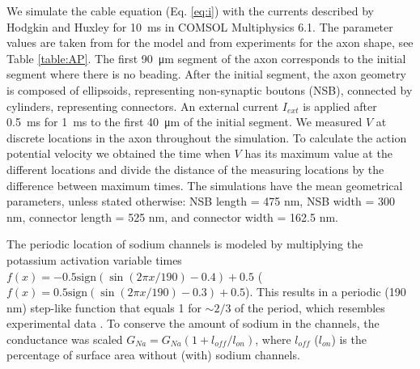 \documentclass[11pt]{article}
\begin{document}
We simulate the cable equation (Eq. \eqref{eq:i}) with the currents described by Hodgkin and Huxley for \SI{10}{\milli\second} in COMSOL Multiphysics 6.1. The parameter values are taken from \cite{koch2004biophysics} for the model and from experiments for the axon shape, see Table \ref{table:AP}. The first \SI{90}{\micro\meter} segment of the axon corresponds to the initial segment where there is no beading. After the initial segment, the axon geometry is composed of ellipsoids, representing non-synaptic boutons (NSB), connected by cylinders, representing connectors. An external current $I_{ext}$ is applied after \SI{0.5}{\milli\second} for \SI{1}{\milli\second} to the first \SI{40}{\micro\meter} of the initial segment. We measured $V$ at discrete locations in the axon throughout the simulation. To calculate the action potential velocity we obtained the time when $V$ has its maximum value at the different locations and divide the distance of the measuring locations by the difference between maximum times. 
The simulations have the mean geometrical parameters, unless stated otherwise: NSB length = 475 nm, NSB width = 300 nm, connector length = 525 nm, and connector width = 162.5 nm. 

The periodic location of sodium channels is modeled by multiplying the potassium activation variable times $f(x) = -0.5 \mathrm{sign} ( \sin (2\pi x/190)-0.4)+0.5 $ ($f(x) = 0.5 \mathrm{sign} ( \sin (2\pi x/190)-0.3)+0.5 $). This results in a periodic (190 nm) step-like function that equals 1 for $\sim 2/3$ of the period, which resembles experimental data \cite{xu2013actin}. To conserve the amount of sodium in the channels, the conductance was scaled $G_{Na} = G_{Na} ( 1 + l_{off}/l_{on})$, where $l_{off}$ ($l_{on}$) is the percentage of surface area without (with) sodium channels.
\end{document}
